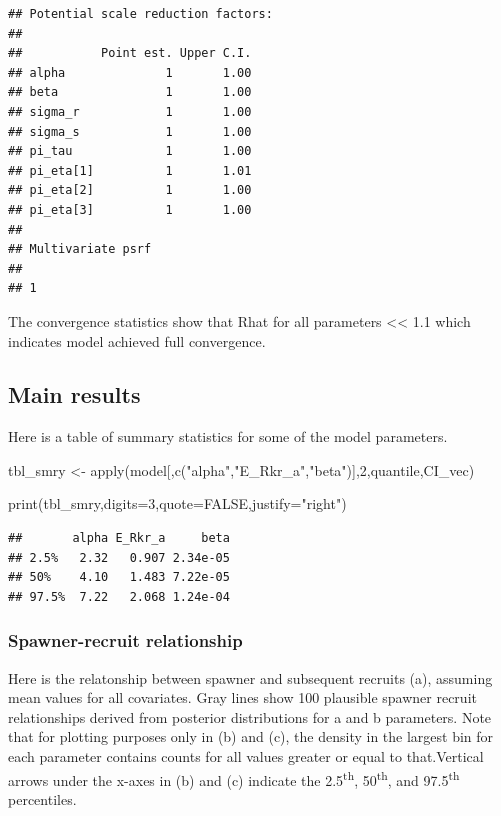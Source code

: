 \documentclass[
  11pt,
]{article}
\newenvironment{Shaded}{}{}
\newcommand{\DataTypeTok}[1]{#1}
\newcommand{\DecValTok}[1]{#1}
\newcommand{\KeywordTok}[1]{\textcolor[rgb]{0.00,0.00,1.00}{#1}}
\newcommand{\NormalTok}[1]{#1}
\newcommand{\OtherTok}[1]{\textcolor[rgb]{1.00,0.25,0.00}{#1}}
\newcommand{\StringTok}[1]{\textcolor[rgb]{0.00,0.50,0.50}{#1}}
\begin{document}
\begin{verbatim}
## Potential scale reduction factors:
## 
##           Point est. Upper C.I.
## alpha              1       1.00
## beta               1       1.00
## sigma_r            1       1.00
## sigma_s            1       1.00
## pi_tau             1       1.00
## pi_eta[1]          1       1.01
## pi_eta[2]          1       1.00
## pi_eta[3]          1       1.00
## 
## Multivariate psrf
## 
## 1
\end{verbatim}

The convergence statistics show that Rhat for all parameters
\textless\textless{} 1.1 which indicates model achieved full
convergence.

\hypertarget{main-results}{%
\subsection{Main results}\label{main-results}}

Here is a table of summary statistics for some of the model parameters.

\begin{Shaded}
\begin{Highlighting}[]
\NormalTok{tbl_smry <-}\StringTok{ }\KeywordTok{apply}\NormalTok{(model[,}\KeywordTok{c}\NormalTok{(}\StringTok{"alpha"}\NormalTok{,}\StringTok{"E_Rkr_a"}\NormalTok{,}\StringTok{"beta"}\NormalTok{)],}\DecValTok{2}\NormalTok{,quantile,CI_vec) }
                        
                        
\KeywordTok{print}\NormalTok{(tbl_smry,}\DataTypeTok{digits=}\DecValTok{3}\NormalTok{,}\DataTypeTok{quote=}\OtherTok{FALSE}\NormalTok{,}\DataTypeTok{justify=}\StringTok{"right"}\NormalTok{)}
\end{Highlighting}
\end{Shaded}

\begin{verbatim}
##       alpha E_Rkr_a     beta
## 2.5%   2.32   0.907 2.34e-05
## 50%    4.10   1.483 7.22e-05
## 97.5%  7.22   2.068 1.24e-04
\end{verbatim}

\hypertarget{spawner-recruit-relationship}{%
\subsubsection{Spawner-recruit
relationship}\label{spawner-recruit-relationship}}

Here is the relatonship between spawner and subsequent recruits (a),
assuming mean values for all covariates. Gray lines show 100 plausible
spawner recruit relationships derived from posterior distributions for a
and b parameters. Note that for plotting purposes only in (b) and (c),
the density in the largest bin for each parameter contains counts for
all values greater or equal to that.Vertical arrows under the x-axes in
(b) and (c) indicate the 2.5\textsuperscript{th},
50\textsuperscript{th}, and 97.5\textsuperscript{th} percentiles.
\end{document}
